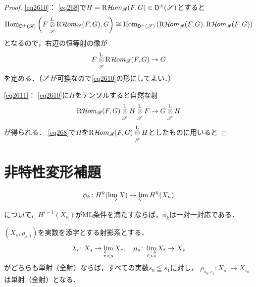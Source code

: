 \begin{proof}
    \eqref{eq2610}：
    \eqref{eq268}で\(
        H=\RHOM_{\scR}(F,G)\in\Dompl(\scS)
    \)とすると
    \[
        \Hom_{\Dompl(\scR)}\left(
            F\lltens[\scS]\RHOM_{\scR}(F,G),G
        \right)
        \cong
        \Hom_{\Dompl(\scS)}\left(
            \RHOM_{\scR}(F,G),\RHOM_{\scR}(F,G)
        \right)
    \]
    となるので，右辺の恒等射の像が
    \[
        F\lltens[\scS]\RHOM_{\scR}(F,G)\to G
    \]
    を定める．（\(\scS\)が可換なので\eqref{eq2610}の形にしてよい．）

    \eqref{eq2611}：
    \eqref{eq2610}に\(H\)をテンソルすると自然な射
    \[
        \RHOM_{\scR}(F,G)\lltens[\scS]H\lltens[\scS]F
        \to 
        G\lltens[\scS]H
    \]
    が得られる．
    \eqref{eq268}で\(H\)を\(
        \RHOM_{\scR}(F,G)\lltens[\scS]H
    \)としたものに用いると
\end{proof}













\clearpage
\section{非特性変形補題}
\begin{leftbar}
    \begin{PRP}[{\cite[Prop. 1.12.4]{KS90}}]\label{PRP1.12.4}
        \[
            \phi_k\colon H^k(\indlim X)\to\prolim H^k(X_n)
        \]
        について，\(H^{i-1}(X_n)\)がML条件を満たすならば，\(\phi_k\)は一対一対応である．
    \end{PRP}
\end{leftbar}
    
\begin{leftbar}
\begin{PRP}[{\cite[Prop. 1.12.6]{KS90}}]\label{PRP1.12.6}
    \((X_s,\rho_{s,t})\)を実数を添字とする射影系とする．
    \[
        \lambda_s\colon X_s\to\prolim[r<s]X_r,
        \quad
        \mu_s\colon\indlim[t>s]X_t\to X_s
    \]
    がどちらも単射（全射）ならば，すべての実数\(s_0\leqq s_1\)に対し，
    \(\rho_{s_0,s_1}\colon X_{s_1}\to X_{s_0}\)は単射（全射）となる．
\end{PRP}
\end{leftbar}

